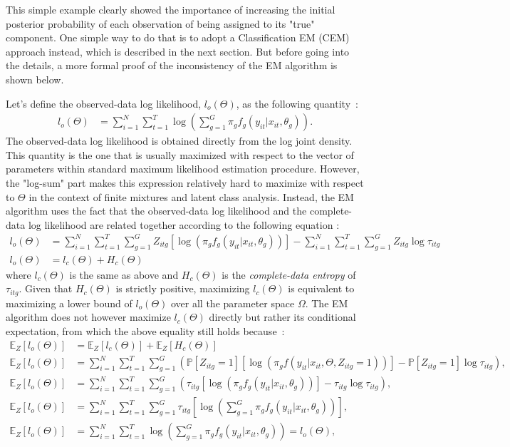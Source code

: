 \documentclass[11pt,letter]{article}
\begin{document}
\par
This simple example clearly showed the importance of increasing the initial posterior probability of each observation of being assigned to its "true" component. One simple way to do that is to adopt a Classification EM (CEM) approach instead, which is described in the next section. But before going into the details, a more formal proof of the inconsistency of the EM algorithm is shown below.
\par
Let's define the observed-data log likelihood, $l_o(\Theta)$, as the following quantity~:
\begin{align}\label{eqn:12}
l_o(\Theta) &=  \sum_{i=1}^N \sum_{t=1}^T \log (\sum_{g=1}^G \pi_gf_g(y_{it}|x_{it},\theta_g)).
\end{align}
The observed-data log likelihood is obtained directly from the log joint density. This quantity is the one that is usually maximized with respect to the vector of parameters within standard maximum likelihood estimation procedure. However, the "log-sum" part makes this expression relatively hard to maximize with respect to $\Theta$ in the context of finite mixtures and latent class analysis. Instead, the EM algorithm uses the fact that the observed-data log likelihood and the complete-data log likelihood are related together according to the following equation \citep{fruhwirth-schnatter_em_2019}:
\begin{align}\label{eqn:13}
l_o(\Theta) &= \sum_{i=1}^N \sum_{t=1}^T \sum_{g=1}^G Z_{itg}[\log(\pi_gf_g(y_{it}|x_{it},\theta_g))] - \sum_{i=1}^N \sum_{t=1}^T \sum_{g=1}^G Z_{itg} \log \tau_{itg}\\
l_o(\Theta) &= l_c(\Theta) + H_c(\Theta)  \nonumber
\end{align}
where $l_c(\Theta)$ is the same as above and $H_c(\Theta)$ is the \textit{complete-data entropy} of $\tau_{itg}$. Given that $H_c(\Theta)$ is strictly positive, maximizing $l_c(\Theta)$ is equivalent to maximizing a lower bound of $l_o(\Theta)$ over all the parameter space $\Omega$. The EM algorithm does not however maximize $l_c(\Theta)$ directly but rather its conditional expectation, from which the above equality still holds because~:
\begin{align}\label{eqn:14}
\mathbb{E}_{Z}[l_o(\Theta)] &= \mathbb{E}_{Z}[l_c(\Theta)] + \mathbb{E}_{Z}[H_c(\Theta)]\nonumber \\
\mathbb{E}_{Z}[l_o(\Theta)] &= \sum_{i=1}^N \sum_{t=1}^T \sum_{g=1}^G (\mathbb{P}[Z_{itg}=1][\log(\pi_gf(y_{it}|x_{it},\Theta, Z_{itg}=1))] - \mathbb{P}[Z_{itg}=1]\log \tau_{itg}), \nonumber \\
\mathbb{E}_{Z}[l_o(\Theta)] &= \sum_{i=1}^N \sum_{t=1}^T \sum_{g=1}^G (\tau_{itg}[\log(\pi_gf_g(y_{it}|x_{it},\theta_g))] - \tau_{itg} \log \tau_{itg}), \\
\mathbb{E}_{Z}[l_o(\Theta)] &= \sum_{i=1}^N \sum_{t=1}^T \sum_{g=1}^G \tau_{itg}[\log(\sum_{g=1}^G \pi_gf_g(y_{it}|x_{it},\theta_g))], \nonumber \\
\mathbb{E}_{Z}[l_o(\Theta)] &= \sum_{i=1}^N \sum_{t=1}^T \log(\sum_{g=1}^G \pi_gf_g(y_{it}|x_{it},\theta_g)) = l_o(\Theta), \nonumber
\end{align}
\end{document}
